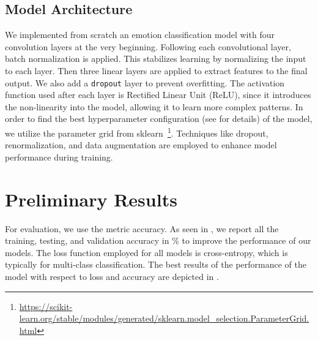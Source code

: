 \subsection{Model Architecture}
We implemented from scratch an emotion classification model with four convolution layers at the very beginning. 
Following each convolutional layer, 
batch normalization is applied. 
This stabilizes learning by normalizing the input to each layer. 
Then three linear layers are applied to extract features to the final output. 
We also add a \texttt{dropout} layer to prevent overfitting. 
The activation function used after each layer is Rectified Linear Unit (ReLU), 
since it introduces the non-linearity into the model, 
allowing it to learn more complex patterns. 
In order to find the best hyperparameter configuration (see  for details) of the model, 
we utilize the parameter grid from sklearn~\footnote{\url{https://scikit-learn.org/stable/modules/generated/sklearn.model_selection.ParameterGrid.html}}.
Techniques like dropout, renormalization, and data augmentation are employed to enhance model performance during training.


\section{Preliminary Results}
\label{sec:result}

For evaluation, we use the metric accuracy. 
As seen in , 
we report all the training, testing, and validation accuracy in \% to improve the performance of our models. 
The loss function employed for all models is cross-entropy, which is typically for multi-class classification. 
The best results of the performance of the model with respect to loss and accuracy are depicted in .

\begin{table}
  \centering
  \caption{Accuracy (\%) for different models in our experiments}
  \label{tab:model}
\end{table}

